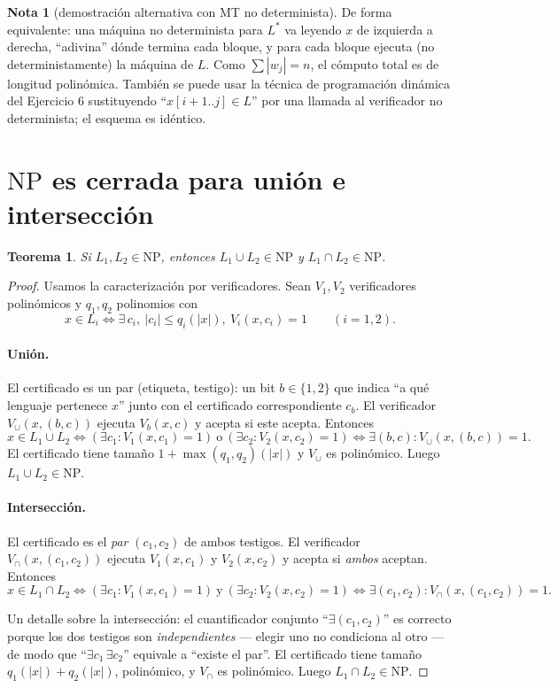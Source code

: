 \documentclass[11pt,a4paper]{article}
\theoremstyle{plain}
\newtheorem{teorema}{Teorema}
\theoremstyle{definition}
\newtheorem*{nota}{Nota}
\newcommand{\NP}{\mathrm{NP}}
\newcommand{\Lstar}{L^{*}}
\begin{document}
\begin{nota}[demostraci\'on alternativa con MT no determinista]
De forma equivalente: una m\'aquina no determinista para $\Lstar$ va leyendo $x$ de
izquierda a derecha, ``adivina'' d\'onde termina cada bloque, y para cada bloque
ejecuta (no deterministamente) la m\'aquina de $L$. Como $\sum|w_j|=n$, el c\'omputo
total es de longitud polin\'omica. Tambi\'en se puede usar la t\'ecnica de
programaci\'on din\'amica del Ejercicio 6 sustituyendo ``$x[i+1..j]\in L$'' por una
llamada al verificador no determinista; el esquema es id\'entico.
\end{nota}

\section{$\NP$ es cerrada para uni\'on e intersecci\'on}

\begin{teorema}
Si $L_1,L_2\in\NP$, entonces $L_1\cup L_2\in\NP$ y $L_1\cap L_2\in\NP$.
\end{teorema}

\begin{proof}
Usamos la caracterizaci\'on por verificadores. Sean $V_1,V_2$ verificadores
polin\'omicos y $q_1,q_2$ polinomios con
\[
x\in L_i \iff \exists\, c_i,\ |c_i|\le q_i(|x|),\ V_i(x,c_i)=1
\qquad (i=1,2).
\]

\paragraph{Uni\'on.} El certificado es un par (etiqueta, testigo): un bit
$b\in\{1,2\}$ que indica ``a qu\'e lenguaje pertenece $x$'' junto con el certificado
correspondiente $c_b$. El verificador $V_\cup(x,(b,c))$ ejecuta $V_b(x,c)$ y acepta
si este acepta. Entonces
\[
x\in L_1\cup L_2 \iff (\exists c_1: V_1(x,c_1)=1)\ \text{o}\ (\exists c_2:
V_2(x,c_2)=1) \iff \exists (b,c): V_\cup(x,(b,c))=1 .
\]
El certificado tiene tama\~no $1+\max(q_1,q_2)(|x|)$ y $V_\cup$ es polin\'omico. Luego
$L_1\cup L_2\in\NP$.

\paragraph{Intersecci\'on.} El certificado es el \emph{par} $(c_1,c_2)$ de ambos
testigos. El verificador $V_\cap(x,(c_1,c_2))$ ejecuta $V_1(x,c_1)$ y $V_2(x,c_2)$ y
acepta si \emph{ambos} aceptan. Entonces
\[
x\in L_1\cap L_2 \iff (\exists c_1: V_1(x,c_1)=1)\ \text{y}\ (\exists c_2:
V_2(x,c_2)=1)\iff \exists(c_1,c_2): V_\cap(x,(c_1,c_2))=1 .
\]

\medskip
Un detalle sobre la intersecci\'on: el cuantificador conjunto
``$\exists(c_1,c_2)$'' es correcto porque los dos testigos son
\emph{independientes} --- elegir uno no condiciona al otro --- de modo que
``$\exists c_1\,\exists c_2$'' equivale a ``existe el par''. El certificado tiene
tama\~no $q_1(|x|)+q_2(|x|)$, polin\'omico, y $V_\cap$ es polin\'omico. Luego
$L_1\cap L_2\in\NP$.
\end{proof}
\end{document}
